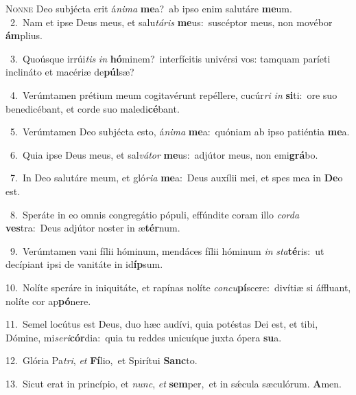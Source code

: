 \lettrine{\initial\textcolor{\initialcolor}{N}}{onne} Deo subjécta erit á\-\textit{ni}\-\textit{ma} \textbf{me}\-a?~\star ab ipso enim salutáre \textbf{me}\-um.\\
{\numbfont\textcolor{\numbcolor}{~2.}}~Nam et ipse Deus meus, et salu\-\textit{tá}\-\textit{ris} \textbf{me}\-us:~\star suscéptor meus, non movébor \textbf{ám}\-plius.\par
{\numbfont\textcolor{\numbcolor}{~3.}}~Quoúsque irrúi\textit{tis} \textit{in} \textbf{hó}\-minem?~\star interfícitis univérsi vos: tamquam paríeti inclináto et macériæ de\-\textbf{púl}\-sæ?\par
{\numbfont\textcolor{\numbcolor}{~4.}}~Verúmtamen prétium meum cogitavérunt repéllere, cucúr\textit{ri} \textit{in} \textbf{si}\-ti:~\star ore suo benedicébant, et corde suo maledi\-\textbf{cé}\-bant.\par
{\numbfont\textcolor{\numbcolor}{~5.}}~Verúmtamen Deo subjécta esto, á\-\textit{ni}\-\textit{ma} \textbf{me}\-a:~\star quóniam ab ipso patiéntia \textbf{me}\-a.\par
{\numbfont\textcolor{\numbcolor}{~6.}}~Quia ipse Deus meus, et sal\-\textit{vá}\-\textit{tor} \textbf{me}\-us:~\star adjútor meus, non emi\-\textbf{grá}\-bo.\par
{\numbfont\textcolor{\numbcolor}{~7.}}~In Deo salutáre meum, et gló\-\textit{ri}\-\textit{a} \textbf{me}\-a:~\star Deus auxílii mei, et spes mea in \textbf{De}\-o est.\par
{\numbfont\textcolor{\numbcolor}{~8.}}~Speráte in eo omnis congregátio pópuli, effúndite coram illo \textit{cor}\-\textit{da} \textbf{ves}\-tra:~\star Deus adjútor noster in æ\-\textbf{tér}\-num.\par
{\numbfont\textcolor{\numbcolor}{~9.}}~Verúmtamen vani fílii hóminum, mendáces fílii hóminum \textit{in} \textit{sta}\-\textbf{té}ris:~\star ut decípiant ipsi de vanitáte in id\-\textbf{íp}\-sum.\par
{\numbfont\textcolor{\numbcolor}{10.}}~Nolíte speráre in iniquitáte, et rapínas nolíte \textit{con}\-\textit{cu}\textbf{pí}scere:~\star divítiæ si áffluant, nolíte cor ap\-\textbf{pó}\-nere.\par
{\numbfont\textcolor{\numbcolor}{11.}}~Semel locútus est Deus, duo hæc audívi, quia potéstas Dei est, et tibi, Dómine, mi\-\textit{se}\-\textit{ri}\textbf{cór}dia:~\star quia tu reddes unicuíque juxta ópera \textbf{su}\-a.\par
{\numbfont\textcolor{\numbcolor}{12.}}~Glória Pa\-\textit{tri}\-, \textit{et} \textbf{Fí}\-lio,~\star et Spirítui \textbf{Sanc}\-to.\par
{\numbfont\textcolor{\numbcolor}{13.}}~Sicut erat in princípio, et \textit{nunc}\-, \textit{et} \textbf{sem}\-per,~\star et in sǽcula sæculórum. \textbf{A}\-men.\par

